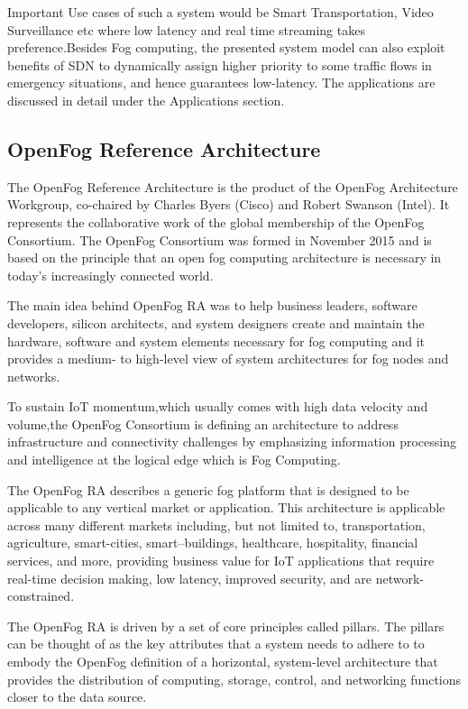 \documentclass{article}
\begin{document}
Important Use cases of such a system would be Smart Transportation, Video Surveillance etc where low latency and real time streaming takes preference.Besides Fog computing, the presented system model can also exploit benefits of SDN to dynamically assign higher priority to some traffic flows in emergency situations, and hence guarantees low-latency. 
The applications are discussed in detail under the Applications section.
\pagebreak
\subsection{OpenFog Reference Architecture}

The OpenFog Reference Architecture is the product of the OpenFog Architecture Workgroup, co-chaired by Charles Byers (Cisco) and Robert Swanson (Intel)\cite{openfogconsortium2017}. 
It represents the collaborative work of the global membership of the OpenFog Consortium\cite{openfogconsortium2017}. 
The OpenFog Consortium was formed in November 2015 and is based on the principle that an open fog computing architecture is necessary in today’s increasingly connected world\cite{openfogconsortium2017}.

The main idea behind OpenFog RA was to help business leaders, software developers, silicon architects, and system designers create and maintain the hardware, software and system elements necessary for fog computing and it provides a medium- to high-level view of system architectures for fog nodes and networks.

To sustain IoT momentum,which usually comes with high data velocity and volume,the OpenFog Consortium is defining an architecture to address infrastructure and connectivity challenges by emphasizing information processing and intelligence at the logical edge which is Fog Computing.

The OpenFog RA describes a generic fog platform that is designed to be applicable to any vertical market or application. This architecture is applicable across many different markets including, but not limited to, transportation, agriculture, smart-cities, smart–buildings, healthcare, hospitality, financial services, and more, providing business value for IoT applications that require real-time decision making, low latency, improved security, and are network-constrained\cite{openfogconsortium2017}.

The OpenFog RA is driven by a set of core principles called pillars\cite{openfogconsortium2017}.
The pillars can be thought of as the key attributes that a system needs to adhere to to embody the OpenFog definition of a horizontal, system-level architecture that provides the distribution of computing, storage, control, and networking functions closer to the data source\cite{openfogconsortium2017}.
\end{document}
